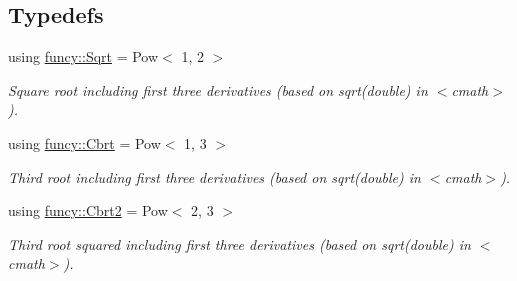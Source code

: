 \subsection*{Typedefs}
\begin{DoxyCompactItemize}
\item 
using \hyperlink{group__CMathGroup_gaa9e33b480a11f18dc15d5da847d88ff5}{funcy\-::\-Sqrt} = Pow$<$ 1, 2 $>$
\begin{DoxyCompactList}\small\item\em Square root including first three derivatives (based on sqrt(double) in $<$cmath$>$). \end{DoxyCompactList}\item 
using \hyperlink{group__CMathGroup_ga73e089e38b8f293e9d7f6a1f617268e8}{funcy\-::\-Cbrt} = Pow$<$ 1, 3 $>$
\begin{DoxyCompactList}\small\item\em Third root including first three derivatives (based on sqrt(double) in $<$cmath$>$). \end{DoxyCompactList}\item 
using \hyperlink{group__CMathGroup_gae9ee48794104aa14e38c34cfa90a33ac}{funcy\-::\-Cbrt2} = Pow$<$ 2, 3 $>$
\begin{DoxyCompactList}\small\item\em Third root squared including first three derivatives (based on sqrt(double) in $<$cmath$>$). \end{DoxyCompactList}\end{DoxyCompactItemize}
